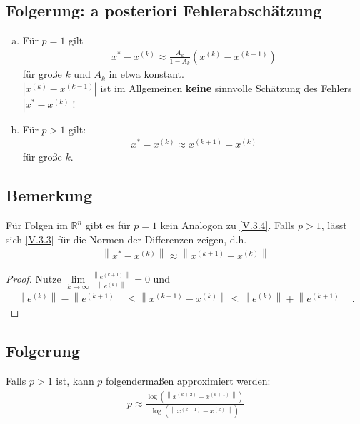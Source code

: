 \documentclass[ngerman,fontsize=11pt, paper=a4, parskip=half, titlepage=true, toc=bib]{scrbook}
\newcommand{\R}{\mathds{R}}
\newcommand{\nn}[1]{\left\| #1 \right\|}
\begin{document}
  \subsection{Folgerung: a posteriori Fehlerabschätzung}
  \begin{enumerate}[a)]
  \item Für $p=1$ gilt
    \begin{gather}
      x^{*}-x^{(k)} \approx \frac{A_k}{1-A_k}(x^{(k)}-x^{(k-1)})
      \label{V.3.4}
    \end{gather}
    für große $k$ und $A_k$ in etwa konstant. \\
    $|x^{(k)}-x^{(k-1)}|$ ist im Allgemeinen \textbf{keine} sinnvolle Schätzung
    des Fehlers $|x^{*}-x^{(k)}|$!
  \item Für $p>1$ gilt:
    \begin{gather}
      x^{*}-x^{(k)} \approx x^{(k+1)}-x^{(k)}
      \label{V.3.5}
    \end{gather}
    für große $k$.
  \end{enumerate}
  
  \subsection{Bemerkung}
  Für Folgen im $\R^n$ gibt es für $p=1$ kein Analogon zu \eqref{V.3.4}.
  Falls $p>1$, lässt sich \eqref{V.3.3} für die Normen der Differenzen zeigen,
  d.h.
  \begin{gather}
    \nn{x^{*}-x^{(k)}} \approx \nn{x^{(k+1)}-x^{(k)}}
    \label{V.3.6}
  \end{gather}
  
  \begin{proof}
    Nutze $\lim\limits_{k\rightarrow\infty} \frac{\nn{e^{(k+1)}}}{\nn{e^{(k)}}} =0$
    und 
    \begin{gather*}
      \nn{e^{(k)}}-\nn{e^{(k+1)}}\leq \nn{x^{(k+1)}-x^{(k)}} \leq \nn{e^{(k)}}+\nn{e^{(k+1)}} \, .
    \end{gather*}
  \end{proof}
  
  \subsection{Folgerung}
  Falls $p>1$ ist, kann $p$ folgendermaßen approximiert werden:
  \begin{gather*}
    p \approx \frac{\log(\nn{x^{(k+2)}-x^{(k+1)}})}{\log(\nn{x^{(k+1)}-x^{(k)}})}
  \end{gather*}
  
\end{document}
